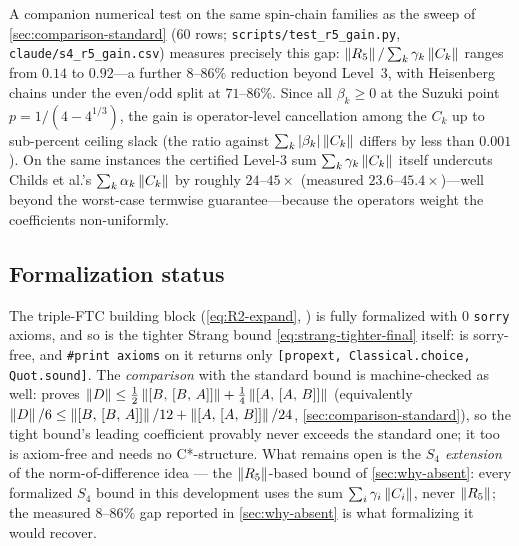 A companion numerical test on the same spin-chain families as the sweep of
\cref{sec:comparison-standard} (60 rows; \texttt{scripts/test\_r5\_gain.py},
\texttt{claude/s4\_r5\_gain.csv}) measures precisely this gap:
$\left\|R_5\right\|/\sum_k \gamma_k \left\|C_k\right\|$ ranges from $0.14$ to $0.92$---a
further $8$--$86\%$ reduction beyond Level~3, with Heisenberg chains under
the even/odd split at $71$--$86\%$. Since all $\beta_k \ge 0$ at the Suzuki
point $p = 1/(4-4^{1/3})$, the gain is operator-level cancellation among
the $C_k$ up to sub-percent ceiling slack (the ratio against
$\sum_k \left|\beta_k\right|\left\|C_k\right\|$ differs by less than $0.001$). On the same instances the certified Level-3 sum
$\sum_k \gamma_k \left\|C_k\right\|$ itself undercuts Childs et al.'s
$\sum_k \alpha_k \left\|C_k\right\|$ by roughly $24$--$45\times$ (measured
$23.6$--$45.4\times$)---well beyond the worst-case
termwise guarantee---because the operators weight the coefficients
non-uniformly.

\subsection{Formalization status}

The triple-FTC building block (\cref{eq:R2-expand},
) is fully formalized with 0
\texttt{sorry} axioms, and so is the tighter Strang bound
\eqref{eq:strang-tighter-final} itself:
is sorry-free, and \texttt{\#print axioms} on it returns only
\texttt{[propext, Classical.choice, Quot.sound]}.
The \emph{comparison} with the standard bound is machine-checked as well:
proves $\left\|D\right\| \le \tfrac12\left\|[B,\,[B,\,A]]\right\|
+ \tfrac14\left\|[A,\,[A,\,B]]\right\|$ (equivalently
$\left\|D\right\|/6 \le \left\|[B,\,[B,\,A]]\right\|/12
+ \left\|[A,\,[A,\,B]]\right\|/24$, \cref{sec:comparison-standard}), so the
tight bound's leading coefficient provably never exceeds the standard one; it
too is axiom-free and needs no C*-structure. What remains open is the
\emph{$S_4$ extension} of the norm-of-difference idea --- the $\left\|R_5\right\|$-based
bound of \cref{sec:why-absent}: every formalized $S_4$ bound in this development
uses the sum $\sum_i \gamma_i \left\|C_i\right\|$, never $\left\|R_5\right\|$; the measured
$8$--$86\%$ gap reported in \cref{sec:why-absent} is what formalizing it
would recover.
